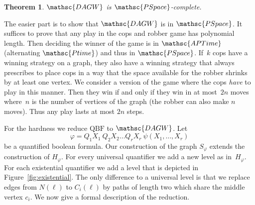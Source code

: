 \documentclass[authoryear]{article}
\newtheorem{theorem}{Theorem}
\theoremstyle{definition}
\renewcommand{\phi}{\varphi}
\newcommand{\0}{\emptyset}
\newcommand{\ptime}{\ensuremath{\mathsc{Ptime}}\xspace}
\newcommand{\pspace}{\ensuremath{\mathsc{PSpace}}\xspace}
\newcommand{\aptime}{\ensuremath{\mathsc{APTime}}\xspace}
\newcommand{\DAGWprob}{\ensuremath{\mathsc{DAGW}}\xspace}
\newcommand{\QBF}{\ensuremath{\mathrm{QBF}}\xspace}
\begin{document}
\begin{theorem}\label{thm:dagw-pspace-c}
 \DAGWprob is \pspace-complete.
\end{theorem}
The easier part is to show that \DAGWprob is in \pspace. It suffices to prove
that any play in the cops and robber game has polynomial length. Then deciding
the winner of the game is in \aptime (alternating \ptime) and thus in
\pspace. If~$k$ cops have a winning strategy on a graph, they also have a
winning strategy that always prescribes to place cops in a way that the space
available for the robber shrinks by at least one vertex. We consider a version
of the game where the cops \emph{have} to play in this manner. Then they win if
and only if they win in at most~$2n$ moves where~$n$ is the number of vertices
of the graph (the robber can also make $n$ moves). Thus any play lasts at most $2n$ steps.

For the hardness we reduce \QBF to \DAGWprob. Let \[\phi = Q_1
X_1\ Q_2 X_2\ldots Q_r X_r\ \psi(X_1,\ldots,X_r)\] be a quantified
boolean formula. Our construction of the graph $S_\phi$ extends the
construction of $H_\phi$. For every universal
quantifier we add a new level as in~$H_\phi$. For each existential quantifier we add a
level that is depicted in Figure~\ref{fig:existential}. The only
difference to a universal level is that we replace edges from
$N(\ell)$ to $C_i(\ell)$ by paths of length two which share the middle
vertex $c_i$. We now give a formal
description of the reduction.
\end{document}
